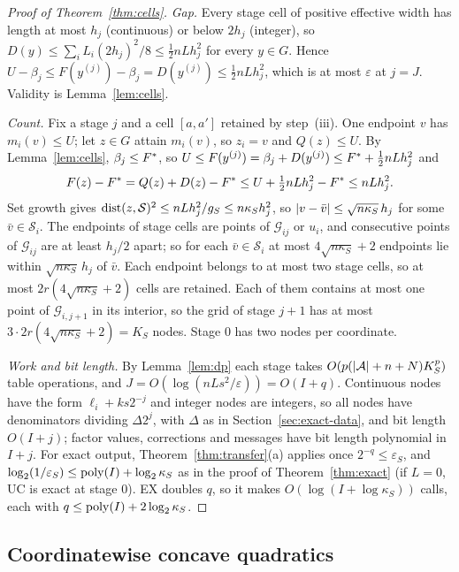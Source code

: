 \begin{proof}[Proof of Theorem~\ref{thm:cells}]
\emph{Gap.} Every stage cell of positive effective width has length at most
$h_j$ (continuous) or below $2h_j$ (integer), so
$D(y)\le\sum_iL_i(2h_j)^2/8\le\frac12nLh_j^2$ for every $y\in G$. Hence
$U-\beta_j\le F(y^{(j)})-\beta_j=D(y^{(j)})\le\frac12nLh_j^2$, which is at
most $\varepsilon$ at $j=J$. Validity is Lemma~\ref{lem:cells}.

\emph{Count.} Fix a stage $j$ and a cell $[a,a']$ retained by step~(iii).
One endpoint $v$ has $m_i(v)\le U$; let $z\in G$ attain $m_i(v)$, so $z_i=v$
and $Q(z)\le U$. By Lemma~\ref{lem:cells}, $\beta_j\le F^{*}$, so
$U\le F(y^{(j)})=\beta_j+D(y^{(j)})\le F^{*}+\frac12nLh_j^2$ and
\[
F(z)-F^{*}=Q(z)+D(z)-F^{*}\le U+\tfrac12nLh_j^2-F^{*}\le nLh_j^2 .
\]
Set growth gives $\operatorname{dist}(z,\mathcal S)^2\le nLh_j^2/g_S\le n\kappa_Sh_j^2$, so
$\lvert v-\bar v\rvert\le\sqrt{n\kappa_S}\,h_j$ for some $\bar v\in\mathcal S_i$.
The endpoints of stage cells are points of $\mathcal G_{ij}$ or $u_i$, and
consecutive points of $\mathcal G_{ij}$ are at least $h_j/2$ apart; so for
each $\bar v\in\mathcal S_i$ at most $4\sqrt{n\kappa_S}+2$ endpoints lie
within $\sqrt{n\kappa_S}\,h_j$ of $\bar v$. Each endpoint belongs to at most
two stage cells, so at most $2r(4\sqrt{n\kappa_S}+2)$ cells are retained.
Each of them contains at most one point of $\mathcal G_{i,j+1}$ in its
interior, so the grid of stage $j+1$ has at most
$3\cdot2r(4\sqrt{n\kappa_S}+2)=K_S$ nodes. Stage $0$ has two nodes per
coordinate.

\emph{Work and bit length.} By Lemma~\ref{lem:dp} each stage takes
$O(p(\lvert \mathcal A\rvert+n+N)K_S^p)$ table operations, and
$J=O(\log(nLs^2/\varepsilon))=O(I+q)$. Continuous nodes have the form
$\ell_i+ks2^{-j}$ and integer nodes are integers, so all nodes have
denominators dividing $\Delta2^j$, with $\Delta$ as in
Section~\ref{sec:exact-data}, and bit length $O(I+j)$; factor values,
corrections and messages have bit length polynomial in $I+j$. For exact
output, Theorem~\ref{thm:transfer}(a) applies once $2^{-q}\le\varepsilon_S$,
and $\log_2(1/\varepsilon_S)\le\operatorname{poly}(I)+\log_2\kappa_S$ as in the proof of
Theorem~\ref{thm:exact} (if $L=0$, UC is exact at stage $0$). EX doubles $q$,
so it makes $O(\log(I+\log\kappa_S))$ calls, each with
$q\le\operatorname{poly}(I)+2\log_2\kappa_S$.
\end{proof}

\subsection{Coordinatewise concave quadratics}

